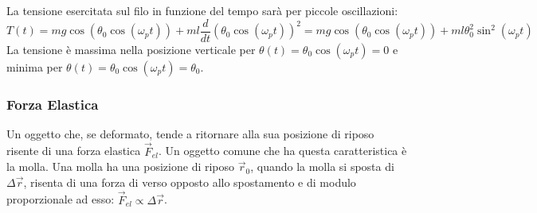 \documentclass{article}
\numberwithin{equation}{subsection}
\begin{document}
La tensione esercitata sul filo in funzione del tempo sarà per piccole oscillazioni:
\begin{equation}
    T(t)=mg\cos(\theta_0\cos(\omega_pt))+ml\displaystyle\frac{d}{dt}(\theta_0\cos(\omega_pt))^{2}=mg\cos(\theta_0\cos(\omega_pt))+
    ml\theta_0^{2}\sin^2(\omega_pt)
\end{equation}
La tensione è massima nella posizione verticale per $\theta(t)=\theta_0\cos(\omega_pt)=0$ e minima per $\theta(t)=\theta_0\cos(\omega_pt)=\theta_0$.  

\begin{center}\end{center}

\subsubsection{Forza Elastica}
Un oggetto che, se deformato, tende a ritornare alla sua posizione 
di riposo risente di una forza elastica $\vec{F}_{el}$. Un oggetto 
comune che ha questa caratteristica è la molla. Una molla ha 
una posizione di riposo $\vec{r}_0$, quando la molla si sposta 
di $\Delta\vec{r}$, risenta di una forza di verso opposto allo 
spostamento e di modulo proporzionale ad esso: $\vec{F}_{el}\propto\Delta\vec{r}$. 
\end{document}
